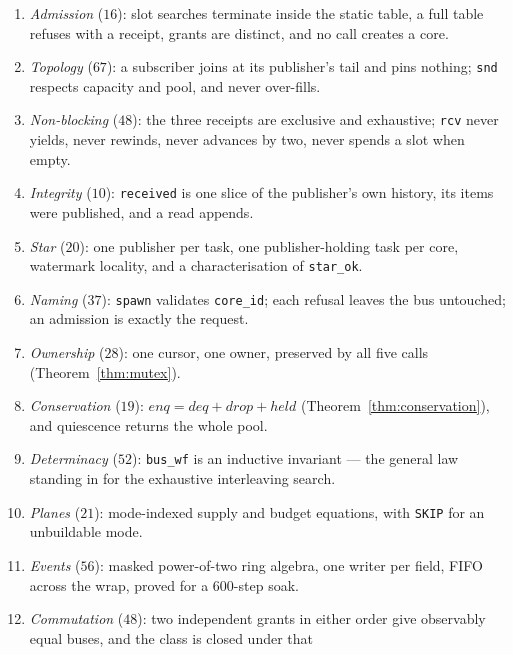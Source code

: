 \documentclass[10pt,journal,compsoc,twocolumn]{article}
\theoremstyle{definition}
\theoremstyle{remark}
\theoremstyle{plain}
\newcommand{\ctr}[1]{\texttt{#1}}
\begin{document}
\begin{enumerate}[leftmargin=*,itemsep=0pt,topsep=2pt]
    \item[\textbf{I1}] \emph{Admission} (\(16\)): slot searches terminate inside
    the static table, a full table refuses with a receipt, grants are distinct,
    and no call creates a core.
    \item[\textbf{I2}] \emph{Topology} (\(67\)): a subscriber joins at its
    publisher's tail and pins nothing; \ctr{snd} respects capacity and pool, and
    never over-fills.
    \item[\textbf{I3}] \emph{Non-blocking} (\(48\)): the three receipts are
    exclusive and exhaustive; \ctr{rcv} never yields, never rewinds, never
    advances by two, never spends a slot when empty.
    \item[\textbf{I4}] \emph{Integrity} (\(10\)): \ctr{received} is one slice of
    the publisher's own history, its items were published, and a read appends.
    \item[\textbf{I5}] \emph{Star} (\(20\)): one publisher per task, one
    publisher-holding task per core, watermark locality, and a characterisation
    of \ctr{star\_ok}.
    \item[\textbf{I6}] \emph{Naming} (\(37\)): \ctr{spawn} validates
    \ctr{core\_id}; each refusal leaves the bus untouched; an admission is
    exactly the request.
    \item[\textbf{I7}] \emph{Ownership} (\(28\)): one cursor, one owner,
    preserved by all five calls (Theorem~\ref{thm:mutex}).
    \item[\textbf{I8}] \emph{Conservation} (\(19\)):
    \(\mathit{enq}=\mathit{deq}+\mathit{drop}+\mathit{held}\)
    (Theorem~\ref{thm:conservation}), and quiescence returns the whole pool.
    \item[\textbf{I9}] \emph{Determinacy} (\(52\)): \ctr{bus\_wf} is an inductive
    invariant --- the general law standing in for the exhaustive interleaving
    search.
    \item[\textbf{I10}] \emph{Planes} (\(21\)): mode-indexed supply and budget
    equations, with \ctr{SKIP} for an unbuildable mode.
    \item[\textbf{I11}] \emph{Events} (\(56\)): masked power-of-two ring algebra,
    one writer per field, FIFO across the wrap, proved for a 600-step soak.
    \item[\textbf{I12}] \emph{Commutation} (\(48\)): two independent grants in
    either order give observably equal buses, and the class is closed under that

\end{enumerate}
\end{document}
